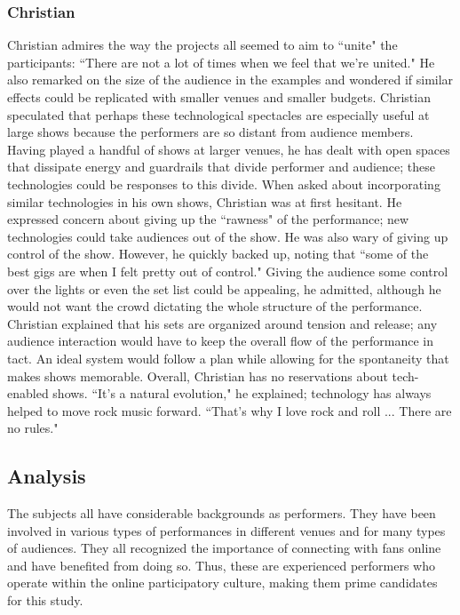\subsubsection{Christian}
Christian admires the way the projects all seemed to aim to ``unite" the participants: ``There are not a lot of times when we feel that we're united." He also remarked on the size of the audience in the examples and wondered if similar effects could be replicated with smaller venues and smaller budgets. Christian speculated that perhaps these technological spectacles are especially useful at large shows because the performers are so distant from audience members. Having played a handful of shows at larger venues, he has dealt with open spaces that dissipate energy and guardrails that divide performer and audience; these technologies could be responses to this divide. When asked about incorporating similar technologies in his own shows, Christian was at first hesitant. He expressed concern about giving up the ``rawness" of the performance; new technologies could take audiences out of the show. He was also wary of giving up control of the show. However, he quickly backed up, noting that ``some of the best gigs are when I felt pretty out of control." Giving the audience some control over the lights or even the set list could be appealing, he admitted, although he would not want the crowd dictating the whole structure of the performance. Christian explained that his sets are organized around tension and release; any audience interaction would have to keep the overall flow of the performance in tact. An ideal system would follow a plan while allowing for the spontaneity that makes shows memorable.  Overall, Christian has no reservations about tech-enabled shows. ``It's a natural evolution," he explained; technology has always helped to move rock music forward. ``That's why I love rock and roll ... There are no rules."

\subsection{Analysis}

The subjects all have considerable backgrounds as performers. They have been involved in various types of performances in different venues and for many types of audiences. They all recognized the importance of connecting with fans online and have benefited from doing so. Thus, these are experienced performers who operate within the online participatory culture, making them prime candidates for this study.

